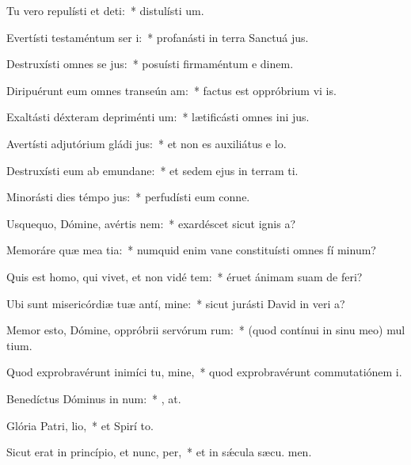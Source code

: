\item Tu vero repulísti et deti:~* distulísti  um.
\item Evertísti testaméntum ser i:~* profanásti in terra Sanctuá jus.
\item Destruxísti omnes se jus:~* posuísti firmaméntum e dinem.
\item Diripuérunt eum omnes transeún am:~* factus est oppróbrium vi is.
\item Exaltásti déxteram depriménti um:~* lætificásti omnes ini jus.
\item Avertísti adjutórium gládi jus:~* et non es auxiliátus e  lo.
\item Destruxísti eum ab emundane:~* et sedem ejus in terram ti.
\item Minorásti dies témpo jus:~* perfudísti eum conne.
\item Usquequo, Dómine, avértis  nem:~* exardéscet sicut ignis  a?
\item Memoráre quæ mea tia:~* numquid enim vane constituísti omnes fí minum?
\item Quis est homo, qui vivet, et non vidé tem:~* éruet ánimam suam de  feri?
\item Ubi sunt misericórdiæ tuæ antí, mine:~* sicut jurásti David in veri a?
\item Memor esto, Dómine, oppróbrii servórum rum:~* (quod contínui in sinu meo) mul tium.
\item Quod exprobravérunt inimíci tu, mine,~* quod exprobravérunt commutatiónem  i.
\item Benedíctus Dóminus in num:~* , at.
\item Glória Patri,  lio,~* et Spirí to.
\item Sicut erat in princípio, et nunc,  per,~* et in sǽcula sæcu. men.
